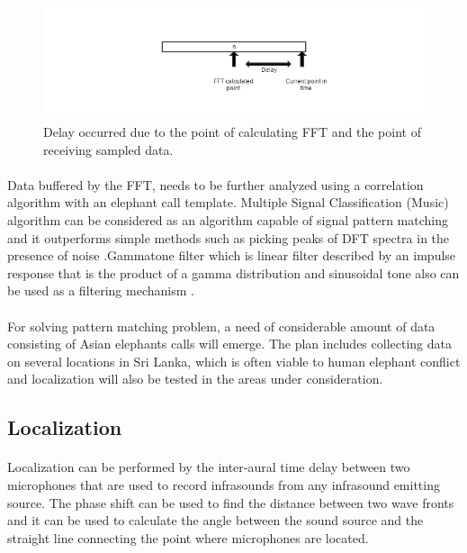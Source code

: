 \documentclass[11pt]{article}
\numberwithin{figure}{section}
\numberwithin{table}{section}
\begin{document}
\begin{figure}[h]
\centering
\includegraphics[width= \textwidth]{c.png}
\caption{Delay occurred due to the point of calculating FFT and the point of receiving sampled data.}
\label{c:logo}
\end{figure}

\paragraph{}
Data buffered by the FFT, needs to be further analyzed using a correlation algorithm with an elephant call template. Multiple Signal Classification (Music) algorithm can be considered as an algorithm capable of signal pattern matching and it outperforms simple methods such as picking peaks of DFT spectra in the presence of noise \cite {12}.Gammatone filter which is linear filter described by an impulse response that is the product of a gamma distribution and sinusoidal tone also can be used as a filtering mechanism \cite{18}.
\paragraph{}
For solving pattern matching problem, a need of considerable amount of data consisting of Asian elephants calls will emerge. The plan includes collecting data on several locations in Sri Lanka, which is often viable to human elephant conflict and localization will also be tested in the areas under consideration. 

\subsection{Localization}
\paragraph{}
Localization can be performed by the inter-aural time delay between two microphones that are used to record infrasounds from any infrasound emitting source. The phase shift can be used to find the distance between two wave fronts and it can be used to calculate the angle between the sound source and the straight line connecting the point where microphones are located.
\end{document}
